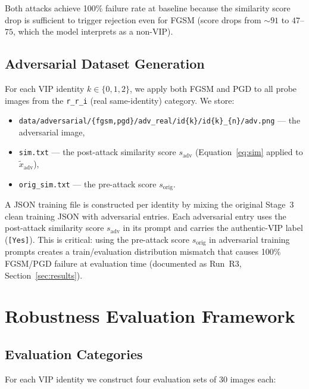 \documentclass[12pt,a4paper]{article}
\begin{document}
Both attacks achieve 100\% failure rate at baseline because the similarity
score drop is sufficient to trigger rejection even for FGSM (score drops from
$\sim\!91$ to $47$--$75$, which the model interprets as a non-VIP).

\subsection{Adversarial Dataset Generation}

For each VIP identity $k \in \{0,1,2\}$, we apply both FGSM and PGD to all
probe images from the \texttt{r\_r\_i} (real same-identity) category.  We store:

\begin{itemize}[leftmargin=*]
  \item \texttt{data/adversarial/\{fgsm,pgd\}/adv\_real/id\{k\}/id\{k\}\_\{n\}/adv.png}
        --- the adversarial image,
  \item \texttt{sim.txt} --- the post-attack similarity score $s_{\text{adv}}$
        (Equation~\ref{eq:sim} applied to $\tilde{x}_{\text{adv}}$),
  \item \texttt{orig\_sim.txt} --- the pre-attack score $s_{\text{orig}}$.
\end{itemize}

A JSON training file is constructed per identity by mixing the original Stage~3
clean training JSON with adversarial entries.  Each adversarial entry uses the
post-attack similarity score $s_{\text{adv}}$ in its prompt and carries the
authentic-VIP label (\texttt{[Yes]}).  This is critical: using the pre-attack
score $s_{\text{orig}}$ in adversarial training prompts creates a
train/evaluation distribution mismatch that causes 100\% FGSM/PGD failure at
evaluation time (documented as Run~R3, Section~\ref{sec:results}).

\section{Robustness Evaluation Framework}

\subsection{Evaluation Categories}

For each VIP identity we construct four evaluation sets of 30 images each:
\end{document}
